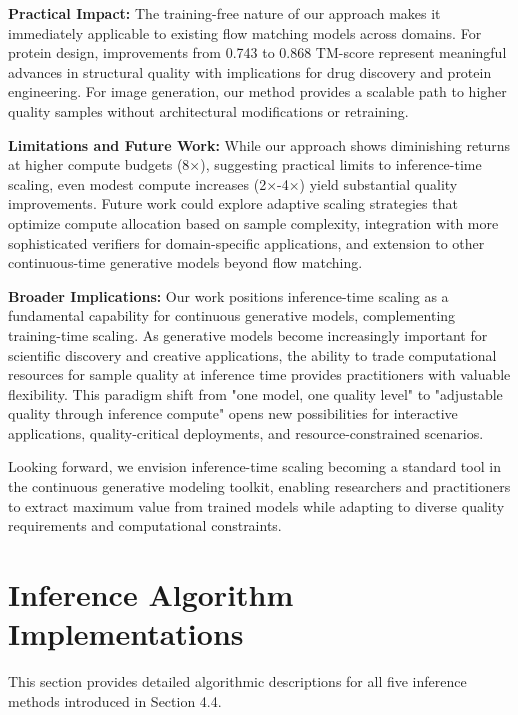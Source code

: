 \documentclass{article}
\begin{document}
\textbf{Practical Impact:} The training-free nature of our approach makes it immediately applicable to existing flow matching models across domains. For protein design, improvements from 0.743 to 0.868 TM-score represent meaningful advances in structural quality with implications for drug discovery and protein engineering. For image generation, our method provides a scalable path to higher quality samples without architectural modifications or retraining.

\textbf{Limitations and Future Work:} While our approach shows diminishing returns at higher compute budgets (8×), suggesting practical limits to inference-time scaling, even modest compute increases (2×-4×) yield substantial quality improvements. Future work could explore adaptive scaling strategies that optimize compute allocation based on sample complexity, integration with more sophisticated verifiers for domain-specific applications, and extension to other continuous-time generative models beyond flow matching.

\textbf{Broader Implications:} Our work positions inference-time scaling as a fundamental capability for continuous generative models, complementing training-time scaling. As generative models become increasingly important for scientific discovery and creative applications, the ability to trade computational resources for sample quality at inference time provides practitioners with valuable flexibility. This paradigm shift from "one model, one quality level" to "adjustable quality through inference compute" opens new possibilities for interactive applications, quality-critical deployments, and resource-constrained scenarios.

Looking forward, we envision inference-time scaling becoming a standard tool in the continuous generative modeling toolkit, enabling researchers and practitioners to extract maximum value from trained models while adapting to diverse quality requirements and computational constraints.





\appendix

\section{Inference Algorithm Implementations}

This section provides detailed algorithmic descriptions for all five inference methods introduced in Section 4.4.
\end{document}
